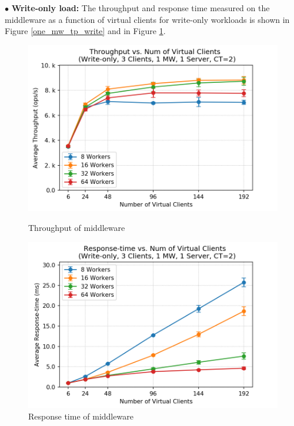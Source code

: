 $\bullet$ \textbf{Write-only load:} 
The throughput and response time measured on the middleware as a function of virtual clients for write-only workloads is shown in Figure \ref{one_mw_tp_write} and in Figure \ref{one_mw_rt_write}. 
\begin{figure}[ht]
   \begin{minipage}{0.48\textwidth}
     \centering
     \includegraphics[width=1\linewidth]{figures/2_BaselineWithMW/one_mw/one_mw_mem_tp_write_2018-12-06_23h08.png}
     \caption{Throughput of middleware}\label{one_mw_tp_write}
   \end{minipage}\hfill
   \begin{minipage}{0.48\textwidth}
     \centering
     \includegraphics[width=1\linewidth]{figures/2_BaselineWithMW/one_mw/one_mw_rt_write_2018-12-06_23h08.png}
     \caption{Response time of middleware}\label{one_mw_rt_write}
   \end{minipage}
\end{figure}

